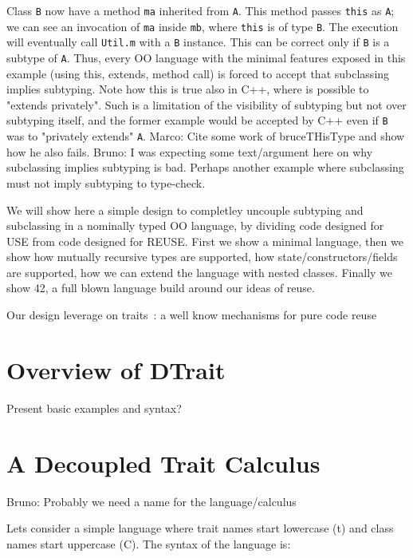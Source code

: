 \documentclass{llncs}
\newcommand{\mynotes}[3]{{\color{#2} {\sc #1}: #3}}
\newcommand\bruno[1]{\mynotes{Bruno}{red}{#1}}
\newcommand\marco[1]{\mynotes{Marco}{blue}{#1}}
\newcommand\name{{\bf DTrait}\xspace}
\begin{document}
Class \lstinline{B} now have a method \lstinline{ma} inherited from \lstinline{A}.
This method passes \lstinline{this} as \lstinline{A}; we can see an invocation of \lstinline{ma}
inside \lstinline{mb}, where \lstinline{this} is of type \lstinline{B}.
The execution will eventually call \lstinline{Util.m} with a \lstinline{B} instance.
This can be correct only if \lstinline{B} is a subtype of \lstinline{A}.
Thus, every OO language with the minimal features 
exposed in this example (using this, extends, method call)
is forced to accept that subclassing implies subtyping.
Note how this is true also in C++, where is possible to
"extends privately". Such is a limitation of the visibility of
subtyping but not over subtyping itself, and the former example
would be accepted by C++ even if \lstinline{B} was to "privately extends" \lstinline{A}.
\marco{Cite some work of bruceTHisType and show how he also fails.}
\bruno{I was expecting some text/argument here on why subclassing
  implies subtyping is bad. Perhaps another example where subclassing 
must not imply subtyping to type-check.}


We will show here a simple design to completley uncouple subtyping
and subclassing in a nominally typed OO language,
by dividing code designed for USE
from code designed for REUSE.
First we show a minimal language, then we show how mutually recursive types
are supported, how state/constructors/fields are supported,
how we can extend the language with nested classes.
Finally we show 42, a full blown language build around our ideas of reuse.

Our design leverage on traits~\cite{}: a well know mechanisms for pure
code reuse

\section{Overview of \name}

Present basic examples and syntax?

\section{A Decoupled Trait Calculus}\bruno{Probably we need a name 
for the language/calculus}

Lets consider a simple language where trait names start lowercase (t)
and class names start uppercase (C).  
The syntax of the language is:\\
\end{document}
